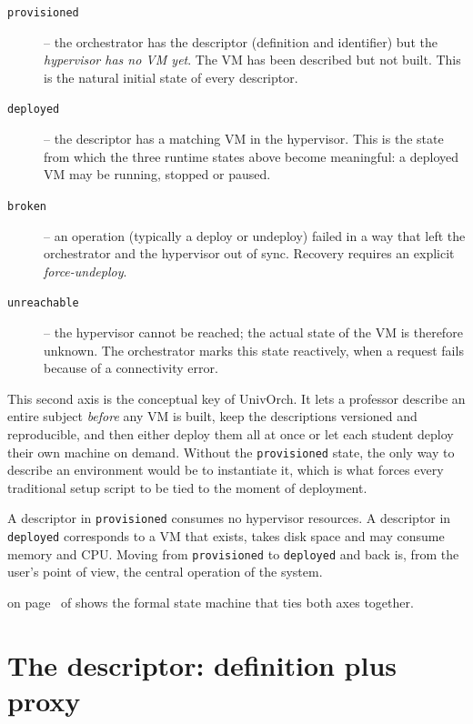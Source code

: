\begin{description}
  \item[\texttt{provisioned}] -- the orchestrator has the
        descriptor (definition and identifier) but the
        \emph{hypervisor has no VM yet}. The VM has been described
        but not built. This is the natural initial state of every
        descriptor.
  \item[\texttt{deployed}] -- the descriptor has a matching VM in
        the hypervisor. This is the state from which the three
        runtime states above become meaningful: a deployed VM may
        be running, stopped or paused.
  \item[\texttt{broken}] -- an operation (typically a deploy or
        undeploy) failed in a way that left the orchestrator and
        the hypervisor out of sync. Recovery requires an explicit
        \emph{force-undeploy}.
  \item[\texttt{unreachable}] -- the hypervisor cannot be reached;
        the actual state of the VM is therefore unknown. The
        orchestrator marks this state reactively, when a request
        fails because of a connectivity error.
\end{description}

This second axis is the conceptual key of UnivOrch. It lets a
professor describe an entire subject \emph{before} any VM is built,
keep the descriptions versioned and reproducible, and then either
deploy them all at once or let each student deploy their own machine
on demand. Without the \texttt{provisioned} state, the only way to
describe an environment would be to instantiate it, which is what
forces every traditional setup script to be tied to the moment of
deployment.

A descriptor in \texttt{provisioned} consumes no hypervisor
resources. A descriptor in \texttt{deployed} corresponds to a VM
that exists, takes disk space and may consume memory and CPU. Moving
from \texttt{provisioned} to \texttt{deployed} and back is, from the
user's point of view, the central operation of the system.

 on page~\pageref{fig:state-machine} of
 shows the formal state machine that ties both
axes together.

\section{The descriptor: definition plus proxy}
\label{sec:descriptor}

